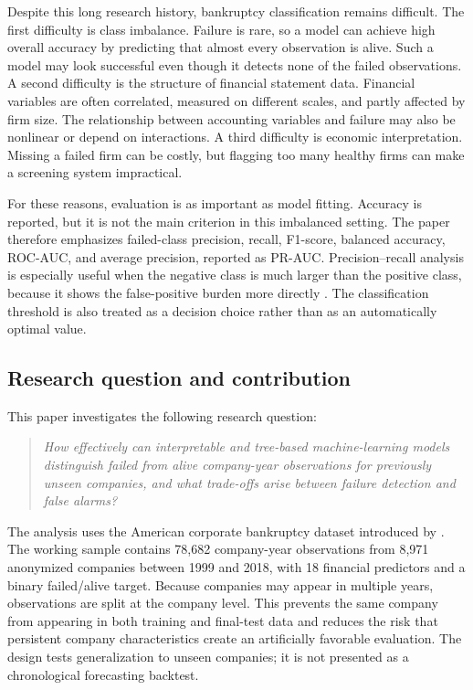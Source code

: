 \documentclass[11pt,a4paper]{article}
\begin{document}
Despite this long research history, bankruptcy classification remains difficult.
The first difficulty is class imbalance. Failure is rare, so a model can achieve
high overall accuracy by predicting that almost every observation is alive. Such
a model may look successful even though it detects none of the failed
observations. A second difficulty is the structure of financial statement data.
Financial variables are often correlated, measured on different scales, and
partly affected by firm size. The relationship between accounting variables and
failure may also be nonlinear or depend on interactions. A third difficulty is
economic interpretation. Missing a failed firm can be costly, but flagging too
many healthy firms can make a screening system impractical.

For these reasons, evaluation is as important as model fitting. Accuracy is
reported, but it is not the main criterion in this imbalanced setting. The paper
therefore emphasizes failed-class precision, recall, F1-score, balanced
accuracy, ROC-AUC, and average precision, reported as PR-AUC. Precision--recall
analysis is especially useful when the negative class is much larger than the
positive class, because it shows the false-positive burden more directly
\citep{davis2006}. The classification threshold is also treated as a decision
choice rather than as an automatically optimal value.

\subsection{Research question and contribution}

This paper investigates the following research question:

\begin{quote}
\emph{How effectively can interpretable and tree-based machine-learning models
distinguish failed from alive company-year observations for previously unseen
companies, and what trade-offs arise between failure detection and false
alarms?}
\end{quote}

The analysis uses the American corporate bankruptcy dataset introduced by
\citet{lombardo2022}. The working sample contains 78,682 company-year
observations from 8,971 anonymized companies between 1999 and 2018, with 18
financial predictors and a binary failed/alive target. Because companies may
appear in multiple years, observations are split at the company level. This
prevents the same company from appearing in both training and final-test data
and reduces the risk that persistent company characteristics create an
artificially favorable evaluation. The design tests generalization to unseen
companies; it is not presented as a chronological forecasting backtest.
\end{document}
